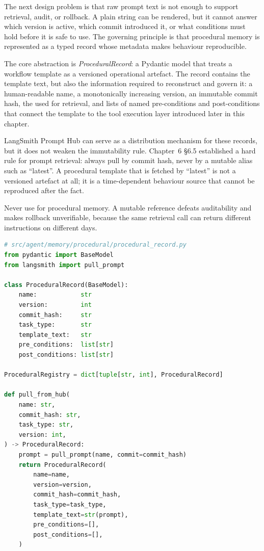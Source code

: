 The next design problem is that raw prompt text is not enough to support retrieval, audit, or rollback. A plain string can be rendered, but it cannot answer which version is active, which commit introduced it, or what conditions must hold before it is safe to use. The governing principle is that procedural memory is represented as a typed record whose metadata makes behaviour reproducible.

The core abstraction is \emph{ProceduralRecord}: a Pydantic model that treats a workflow template as a versioned operational artefact. The record contains the template text, but also the information required to reconstruct and govern it: a human-readable name, a monotonically increasing version, an immutable commit hash, the  used for retrieval, and lists of named pre-conditions and post-conditions that connect the template to the tool execution layer introduced later in this chapter.

LangSmith Prompt Hub can serve as a distribution mechanism for these records, but it does not weaken the immutability rule. Chapter~6 \S6.5 established a hard rule for prompt retrieval: always pull by commit hash, never by a mutable alias such as ``latest''. A procedural template that is fetched by ``latest'' is not a versioned artefact at all; it is a time-dependent behaviour source that cannot be reproduced after the fact.

\begin{warningbox}
Never use  for procedural memory. A mutable reference defeats auditability and makes rollback unverifiable, because the same retrieval call can return different instructions on different days.
\end{warningbox}

\begin{lstlisting}[language=Python,
  caption={ProceduralRecord and hash-pinned Prompt Hub retrieval},
  label={lst:procedural-record}]
# src/agent/memory/procedural/procedural_record.py
from pydantic import BaseModel
from langsmith import pull_prompt

class ProceduralRecord(BaseModel):
    name:            str
    version:         int
    commit_hash:     str
    task_type:       str
    template_text:   str
    pre_conditions:  list[str]
    post_conditions: list[str]

ProceduralRegistry = dict[tuple[str, int], ProceduralRecord]

def pull_from_hub(
    name: str,
    commit_hash: str,
    task_type: str,
    version: int,
) -> ProceduralRecord:
    prompt = pull_prompt(name, commit=commit_hash)
    return ProceduralRecord(
        name=name,
        version=version,
        commit_hash=commit_hash,
        task_type=task_type,
        template_text=str(prompt),
        pre_conditions=[],
        post_conditions=[],
    )
\end{lstlisting}

